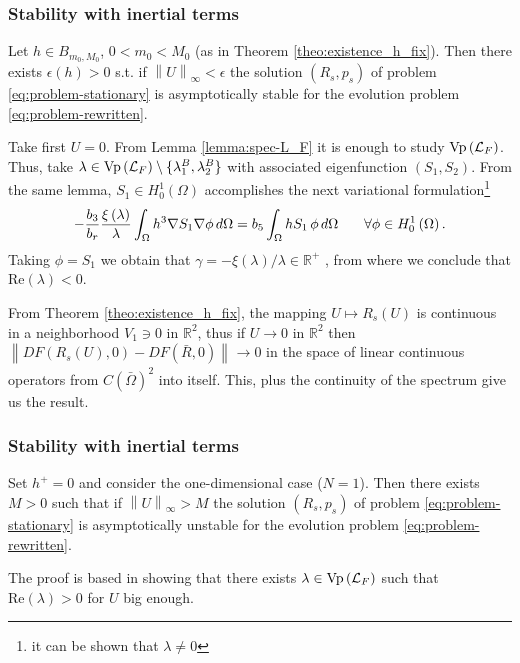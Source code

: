 \documentclass[10pt,aspectratio=169]{beamer}
\newcommand{\hzero}{H^1_0\left(\Omega\right)}
\newcommand{\cont}{C\left(\bar{\Omega}\right)}
\newcommand{\norm}[2]{\left\lVert#1\right\rVert_{#2}}
\newcommand{\Vp}[1]{\textnormal{Vp}\left(#1\right)}
\begin{document}
\begin{frame}
\frametitle{Stability with inertial terms}
\begin{theorem}\label{theo:stabilite-avec-inertie-h-fixe} Let $h\in B_{m_0,M_0}$, $0<m_0<M_0$ (as in Theorem \ref{theo:existence_h_fix}). Then there exists $\epsilon\left(h\right)>0$ s.t. if $\norm{U}{\infty}<\epsilon$ the solution $\left(R_s,p_s\right)$ of problem \eqref{eq:problem-stationary} is asymptotically stable for the evolution problem \eqref{eq:problem-rewritten}.
\end{theorem}
Take first $U=0$. From Lemma \ref{lemma:spec-L_F} it is enough to study $\Vp{\mathcal{L}_F}$. Thus, take $\lambda\in \Vp{\mathcal{L}_F}\setminus\{\lambda_1^B,\lambda_2^B\}$ with associated eigenfunction $\left(S_1,S_2\right)$. From the same lemma, $S_1\in \hzero$ accomplishes the next variational formulation\footnote{it can be shown that $\lambda\neq 0$}
\begin{equation}\small
-\frac{b_3}{b_r}\frac{\xi\left(\lambda\right)}{\lambda}\int_\Omega h^3 \nabla S_1\nabla \phi\,d\Omega=b_5\int_\Omega h S_1\,\phi\,d\Omega\qquad \forall \phi \in \hzero.
\end{equation}
Taking $\phi=S_1$ we obtain that $\gamma=-\xi\left(\lambda\right)/\lambda\in \mathbb{R}^+$ , from where we conclude that $\mbox{Re}\left(\lambda\right)<0$. 

{\color{red}From Theorem \ref{theo:existence_h_fix}}, the mapping $U\mapsto R_s\left(U\right)$ is continuous in a neighborhood $V_1\ni 0$ in $\mathbb{R}^2$, thus if $U\rightarrow 0$ in $\mathbb{R}^2$ then $\norm{DF\left(R_s\left(U\right),0\right)-DF\left(\bar{R},0\right)}{}\rightarrow 0$ in the space of linear continuous operators from $\cont^2$ into itself. This, plus the continuity of the spectrum give us the result.
\end{frame}


\begin{frame}
\frametitle{Stability with inertial terms}
\begin{theorem}\label{theo:instabilite-avec-inertie-U-fixe} Set $h^+=0$ and consider the one-dimensional case ($N=1$). Then there exists $M>0$ such that if $\norm{U}{\infty}>M$ the solution $\left(R_s,p_s\right)$ of problem \eqref{eq:problem-stationary} is asymptotically unstable for the evolution problem \eqref{eq:problem-rewritten}.
\end{theorem}
The proof is based in showing that there exists $\lambda\in \Vp{\mathcal{L}_F}$ such that $\mbox{Re}(\lambda)>0$ for $U$ big enough.
\end{frame}
\end{document}
